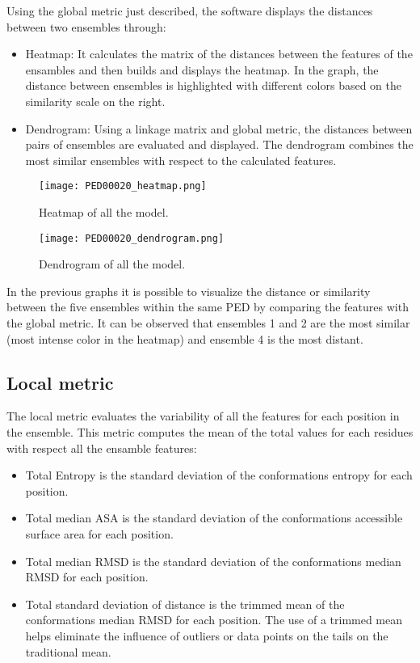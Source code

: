 Using the global metric just described, the software displays the distances between two ensembles through:
\begin{itemize}
\item Heatmap: It calculates the matrix of the distances between the features of the ensambles and then builds and displays the heatmap. In the graph, the distance between ensembles is highlighted with different colors based on the similarity scale on the right. 
\item Dendrogram: Using a linkage matrix and global metric, the distances between pairs of ensembles are evaluated and displayed. The dendrogram combines the most similar ensembles with respect to the calculated features.
\end{itemize}

\begin{figure}[H]
	\begin{minipage}[b]{0.93\textwidth}
		\centering
		\texttt{[image: PED00020\_heatmap.png]}
		\caption{Heatmap of all the model.}
		\label{heatmap}
	\end{minipage}
	\begin{minipage}[b]{0.93\textwidth}
		\centering
		\texttt{[image: PED00020\_dendrogram.png]}
		\caption{Dendrogram of all the model.}
		\label{dendrogram}
	\end{minipage}
\end{figure}

In the previous graphs it is possible to visualize the distance or similarity between the five ensembles within the same PED by comparing the features with the global metric. It can be observed that ensembles 1 and 2 are the most similar (most intense color in the heatmap) and ensemble 4 is the most distant.


\subsection{Local metric}
The local metric evaluates the variability of all the features for each position in the ensemble.
This metric computes the mean of the total values for each residues with respect all the ensamble features:
\begin{itemize}
\item Total Entropy is the standard deviation of the conformations entropy for each position.
\item Total median ASA is the standard deviation of the conformations accessible surface area for each position.
\item Total median RMSD is the standard deviation of the conformations median RMSD for each position.
\item Total standard deviation of distance is the trimmed mean of the conformations median RMSD for each position. 
The use of a trimmed mean helps eliminate the influence of outliers or data points on the tails on the traditional mean.
\end{itemize}

